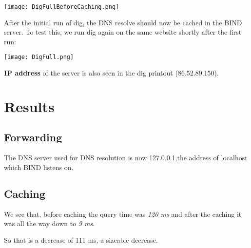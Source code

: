 \begin{center}
	\texttt{[image: DigFullBeforeCaching.png]}
\end{center}

After the initial run of dig, the DNS resolve should now be cached in the BIND server. To test this, we run dig again on the same website shortly after the first run:

\begin{center}
	\texttt{[image: DigFull.png]}
\end{center}

\textbf{IP address}
of the server is also seen in the dig printout (86.52.89.150).

\section{Results}
\subsection{Forwarding}
The DNS server used for DNS resolution is now 127.0.0.1,the address of localhost which BIND listens on.

\subsection{Caching}
We see that, before caching the query time was \textit{120 ms} and after the caching it was all the way down to \textit{9 ms}.

So that is a decrease of 111 ms, a sizeable decrease.






